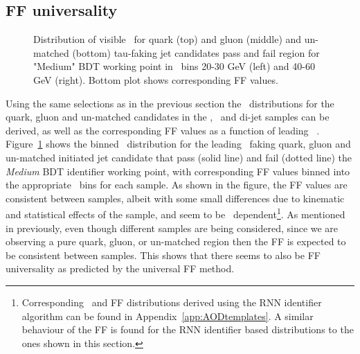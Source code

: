 	\subsection{FF universality}
	\begin{figure}[!hbt]
		\begin{center}
			\hspace{0.05\textwidth}
			\hspace{0.05\textwidth}
			\hspace{0.05\textwidth}
			\hspace{0.05\textwidth}
			\hspace{0.05\textwidth}
			\hspace{0.05\textwidth}
		\end{center}
		\caption{Distribution of visible \htau \pt\ for quark (top) and gluon (middle)  and un-matched (bottom) tau-faking jet candidates pass and fail  region for "Medium" BDT working point in \pt\ bins 20-30 GeV (left) and 40-60 GeV (right). Bottom plot shows corresponding FF values.}
	\label{fig:pT_AOD_dist_FF}
	\end{figure}	
	Using the same selections as in the previous section the \pt\ distributions for the quark, gluon and un-matched candidates in the \Zjets, \Wjets\ and di-jet samples can be derived, as well as the corresponding \ac{FF} values as a function of leading \htau\ \pt. 
	Figure~\ref{fig:pT_AOD_dist_FF} shows the binned \pt\ distribution for the leading \htau\ faking quark, gluon and un-matched initiated jet candidate that pass (solid line) and fail (dotted line) the \textit{Medium} \ac{BDT} identifier working point, with corresponding \ac{FF} values binned into the appropriate \pt\ bins for each sample. 
	As shown in the figure, the \ac{FF} values are consistent between samples, albeit with some small differences due to kinematic and statistical effects of the sample, and seem to be \pt\ dependent\footnote{Corresponding \pt\ and \ac{FF} distributions derived using the \ac{RNN} identifier algorithm can be found in Appendix~\ref{app:AODtemplates}. A similar behaviour of the \ac{FF} is found for the \ac{RNN} identifier based distributions to the ones shown in this section.}.
	As mentioned in previously, even though different samples are being considered, since we are observing a pure quark, gluon, or un-matched region then the \ac{FF} is expected to be consistent between samples. This shows that  there seems to also be \ac{FF} universality as predicted by the universal \ac{FF} method.
